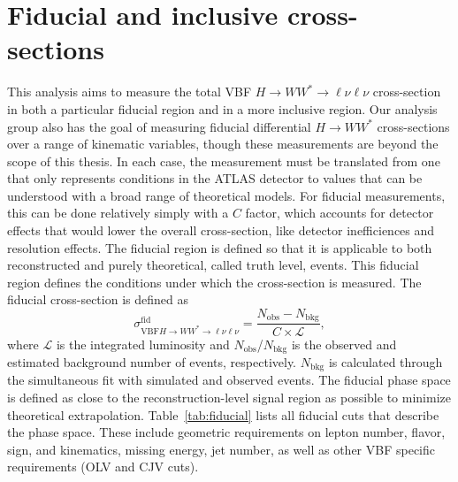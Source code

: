 \section{Fiducial and inclusive cross-sections}
This analysis aims to measure the total VBF $H\rightarrow WW^*\rightarrow\ell\nu\ell\nu$ cross-section in both a particular fiducial region and in a more inclusive region. Our analysis group also has the goal of measuring fiducial differential $H\rightarrow WW^*$ cross-sections over a range of kinematic variables, though these measurements are beyond the scope of this thesis. In each case, the measurement must be translated from one that only represents conditions in the ATLAS detector to values that can be understood with a broad range of theoretical models. For fiducial measurements, this can be done relatively simply with a $C$ factor, which accounts for  detector effects that would lower the overall cross-section, like detector inefficiences and resolution effects. The fiducial region is defined so that it is applicable to both reconstructed and purely theoretical, called truth level, events. This fiducial region defines the conditions under which the cross-section is measured. The fiducial cross-section is defined as
\begin{equation}
\sigma_{\text{VBF}H\rightarrow WW^*\rightarrow\ell\nu\ell\nu}^{\text{fid}} = \frac{N_{\text{obs}}-N_{\text{bkg}}}{C\times\mathcal{L}},
\end{equation} 
where $\mathcal{L}$ is the integrated luminosity and $N_{\text{obs}}$/$N_{\text{bkg}}$ is the observed and estimated background number of events, respectively. $N_{\text{bkg}}$ is calculated through the simultaneous fit with simulated and observed events. The fiducial phase space is defined as close to the reconstruction-level signal region as possible to minimize theoretical extrapolation. Table~\ref{tab:fiducial} lists all fiducial cuts that describe the phase space. These include geometric requirements on lepton number, flavor, sign, and kinematics, missing energy, jet number, as well as other VBF specific requirements (OLV and CJV cuts). 
